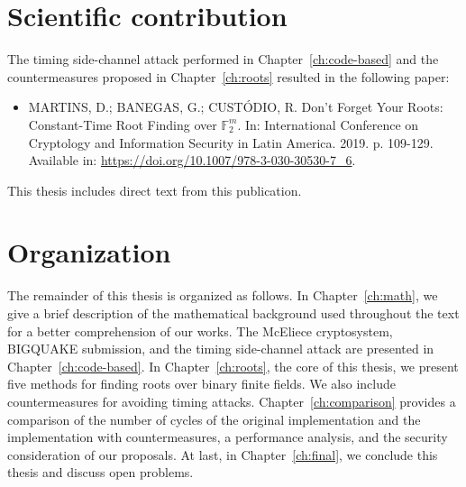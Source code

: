\section{Scientific contribution}
The timing side-channel attack performed in Chapter~\ref{ch:code-based} and the countermeasures proposed in Chapter~\ref{ch:roots} resulted in the following paper:

\begin{itemize}
    \item  MARTINS, D.; BANEGAS, G.; CUSTÓDIO, R. Don’t Forget Your Roots: Constant-Time Root Finding over $\mathbb{F}_2^m$. In: International Conference on Cryptology and Information Security in Latin America.  2019. p. 109-129. Available in: \url{https://doi.org/10.1007/978-3-030-30530-7_6}.
\end{itemize}

This thesis includes direct text from this publication.

\section{Organization}
The remainder of this thesis is organized as follows. In Chapter~\ref{ch:math}, we give a brief description of the mathematical background used throughout the text for a better comprehension of our works. The McEliece cryptosystem, BIGQUAKE submission, and the timing side-channel attack are presented in Chapter~\ref{ch:code-based}. In Chapter~\ref{ch:roots}, the core of this thesis, we present five methods for finding roots over binary finite fields. We also include countermeasures for avoiding timing attacks. Chapter~\ref{ch:comparison} provides a comparison of the number of cycles of the original implementation and the implementation with countermeasures, a performance analysis, and the security consideration of our proposals. At last, in Chapter~\ref{ch:final}, we conclude this thesis and discuss open problems.
